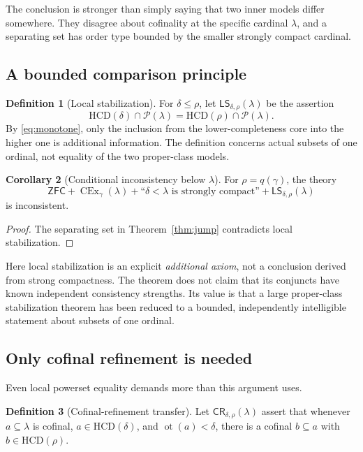 \documentclass[11pt,letterpaper]{article}
\theoremstyle{definition}
\newtheorem{definition}{Definition}[section]
\newtheorem{corollary}[definition]{Corollary}
\newcommand{\ZFC}{\mathsf{ZFC}}
\newcommand{\CEx}{\operatorname{CEx}}
\newcommand{\ot}{\operatorname{ot}}
\newcommand{\HCD}{\mathrm{HCD}}
\newcommand{\LS}{\mathsf{LS}}
\newcommand{\CR}{\mathsf{CR}}
\newcommand{\Pow}{\mathcal{P}}
\begin{document}
The conclusion is stronger than simply saying that two inner models differ somewhere. They disagree about cofinality at the specific cardinal $\lambda$, and a separating set has order type bounded by the smaller strongly compact cardinal.

\subsection{A bounded comparison principle}

\begin{definition}[Local stabilization]
For $\delta\leq\rho$, let $\LS_{\delta,\rho}(\lambda)$ be the assertion
\[
 \HCD(\delta)\cap\Pow(\lambda)
   =\HCD(\rho)\cap\Pow(\lambda).
\]
By \eqref{eq:monotone}, only the inclusion from the lower-completeness core into the higher one is additional information. The definition concerns actual subsets of one ordinal, not equality of the two proper-class models.
\end{definition}

\begin{corollary}[Conditional inconsistency below $\lambda$]\label{cor:LS}
For $\rho=q(\gamma)$, the theory
\[
 \ZFC+\CEx_\gamma(\lambda)
  +\text{``$\delta<\lambda$ is strongly compact''}
  +\LS_{\delta,\rho}(\lambda)
\]
is inconsistent.
\end{corollary}

\begin{proof}
The separating set in Theorem~\ref{thm:jump} contradicts local stabilization.
\end{proof}

Here local stabilization is an explicit \emph{additional axiom}, not a conclusion derived from strong compactness. The theorem does not claim that its conjuncts have known independent consistency strengths. Its value is that a large proper-class stabilization theorem has been reduced to a bounded, independently intelligible statement about subsets of one ordinal.

\subsection{Only cofinal refinement is needed}

Even local powerset equality demands more than this argument uses.

\begin{definition}[Cofinal-refinement transfer]
Let $\CR_{\delta,\rho}(\lambda)$ assert that whenever $a\subseteq\lambda$ is cofinal, $a\in\HCD(\delta)$, and $\ot(a)<\delta$, there is a cofinal $b\subseteq a$ with $b\in\HCD(\rho)$.
\end{definition}
\end{document}
